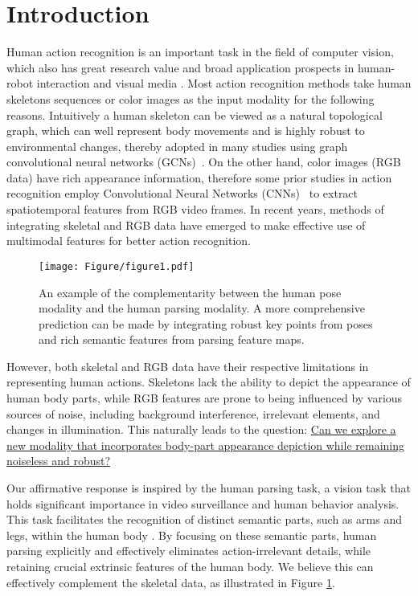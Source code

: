 \documentclass[runningheads]{llncs}
\begin{document}
\section{Introduction}
Human action recognition is an important task in the field of computer vision, which also has great research value and broad application prospects in human-robot interaction \cite{wen2023interactive} and visual media \cite{8247231,zheng2017image}. Most action recognition methods take human skeletons sequences \cite{zhang2022zoom,liu2022generalized,tu2022joint,liu2023temporal,liu2023novel} or color images \cite{tu2019action} as the input modality for the following reasons. Intuitively a human skeleton can be viewed as a natural topological graph, which can well represent body movements and is highly robust to environmental changes, thereby adopted in many studies using graph convolutional neural networks (GCNs)~\cite{tu2022joint,gsgcn2022,shiftgcn2020,dynamicgcn2020,CTR-GCN2021,Chi_2022_CVPR}. On the other hand, color images (RGB data) have rich appearance information, therefore some prior studies in action recognition employ Convolutional Neural Networks (CNNs)~\cite{vpn2020,tu2019action} to extract spatiotemporal features from RGB video frames. In recent years, methods \cite{vpn2020} of integrating skeletal and RGB data have emerged to make effective use of multimodal features for better action recognition.

\begin{figure}[t]
\texttt{[image: Figure/figure1.pdf]}
\vspace{-2em}
\caption{An example of the complementarity between the human pose modality and the human parsing modality. A more comprehensive prediction can be made by integrating robust key points from poses and rich semantic features from parsing feature maps.} \label{teaser}
\end{figure}

However, both skeletal and RGB data have their respective limitations in representing human actions. Skeletons lack the ability to depict the appearance of human body parts, while RGB features are prone to being influenced by various sources of noise, including background interference, irrelevant elements, and changes in illumination. This naturally leads to the question: \uline{Can we explore a new modality that incorporates body-part appearance depiction while remaining noiseless and robust?}

Our affirmative response is inspired by the human parsing task, a vision task that holds significant importance in video surveillance and human behavior analysis. This task facilitates the recognition of distinct semantic parts, such as arms and legs, within the human body \cite{LIP2019}. By focusing on these semantic parts, human parsing explicitly and effectively eliminates action-irrelevant details, while retaining crucial extrinsic features of the human body. We believe this can effectively complement the skeletal data, as illustrated in Figure \ref{teaser}.
\end{document}
